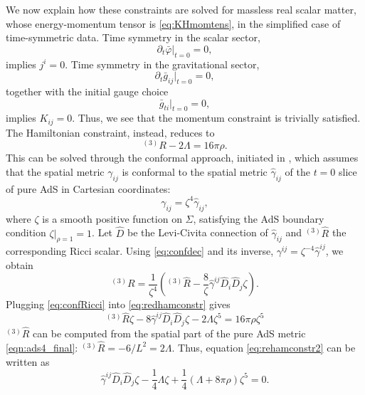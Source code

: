 \documentclass[a4paper,11pt]{article}
\numberwithin{equation}{section}
\begin{document}
We now explain how these constraints are solved for massless real scalar matter, whose energy-momentum tensor is \eqref{eq:KHmomtens}, in the simplified case of time-symmetric data. Time symmetry in the scalar sector,
\begin{equation}
\partial_t \bar{\varphi}\big|_{t=0}=0,
\end{equation}
implies $j^i=0$. Time symmetry in the gravitational sector,
\begin{equation}
\partial_t \bar{g}_{ij}\big|_{t=0}=0,
\end{equation}
together with the initial gauge choice
\begin{equation}
\bar{g}_{ti}\big|_{t=0}=0,
\end{equation}
implies $K_{ij}=0$. Thus, we see that the momentum constraint is trivially satisfied.
The Hamiltonian constraint, instead, reduces to
\begin{equation}
\label{eq:redhamconstr}
^{(3)}R-2\Lambda=16\pi\rho.
\end{equation}
This can be solved through the conformal approach, initiated in \cite{Lichnerowicz:1994}, which assumes that the spatial metric $\gamma_{ij}$ is conformal to the spatial metric $\hat{\gamma}_{ij}$ of the $t=0$ slice of pure AdS in Cartesian coordinates:
\begin{equation}
\label{eq:confdec}
\gamma_{ij}=\zeta^4 \hat{\gamma}_{ij},
\end{equation}
where $\zeta$ is a smooth positive function on $\Sigma$, satisfying the AdS boundary condition $\zeta|_{\rho=1}=1$. Let $\hat{D}$ be the Levi-Civita connection of $\hat{\gamma}_{ij}$ and $^{(3)}\hat{R}$ the corresponding Ricci scalar. Using  \eqref{eq:confdec} and its inverse, $\gamma^{ij}=\zeta^{-4} \hat{\gamma}^{ij}$, we obtain
\begin{equation}
\label{eq:confRicci}
^{(3)}R=\frac{1}{\zeta^4}\left(^{(3)}\hat{R}-\frac{8}{\zeta}\hat{\gamma}^{ij}\hat{D}_i \hat{D}_j \zeta\right).
\end{equation}
Plugging \eqref{eq:confRicci} into \eqref{eq:redhamconstr} gives
\begin{equation}
\label{eq:rehamconstr2}
^{(3)}\hat{R}\zeta-8\hat{\gamma}^{ij}\hat{D}_i \hat{D}_j \zeta-2\Lambda \zeta^5=16\pi\rho \zeta^5
\end{equation}
$^{(3)}\hat{R}$ can be computed from the spatial part of the pure AdS metric \eqref{eqn:ads4_final}: $^{(3)}\hat{R}=-6/L^2=2\Lambda$. Thus, equation \eqref{eq:rehamconstr2} can be written as
\begin{equation}
\label{eq:rehamconstr3}
\hat{\gamma}^{ij}\hat{D}_i \hat{D}_j \zeta-\frac{1}{4}\Lambda\zeta+\frac{1}{4}(\Lambda+8\pi\rho)\zeta^5=0.
\end{equation}
\end{document}
